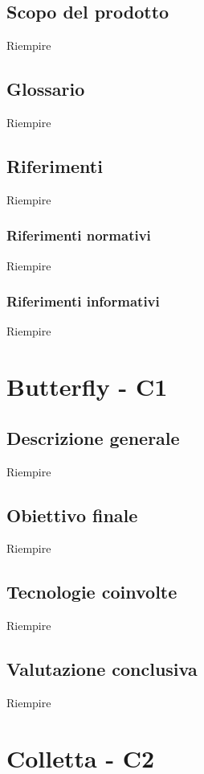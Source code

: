 		\subsection{Scopo del prodotto}
		Riempire
		
		\subsection{Glossario}
		Riempire
		
		\subsection{Riferimenti}
		Riempire
			
			\subsubsection{Riferimenti normativi}
			Riempire
			
			\subsubsection{Riferimenti informativi}
			Riempire
	
	
	\section{Butterfly - C1} \label{c1}
		\subsection{Descrizione generale}
		Riempire
		
		\subsection{Obiettivo finale}
		Riempire
		
		\subsection{Tecnologie coinvolte}
		Riempire
		
		\subsection{Valutazione conclusiva}
		Riempire
		
	
	\section{Colletta - C2} \label{c2}
